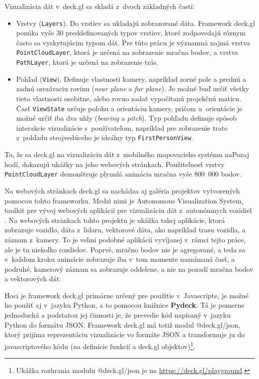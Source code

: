 Vizualizácia dát v~deck.gl sa skladá z~dvoch základných častí:
\begin{itemize}
    \item Vrstvy (\texttt{Layers}). Do vrstiev sa ukladajú zobrazované dáta. Framework deck.gl ponúka vyše 30 preddefinovaných typov vrstiev, ktoré zodpovedajú rôznym často sa vyskytujúcim typom dát. Pre túto prácu je významná najmä vrstva \texttt{PointCloudLayer}, ktorá je určená na zobrazenie mračna bodov, a vrstva \texttt{PathLayer}, ktorá je určená na zobrazenie trás.
    \item Pohľad (\texttt{View}). Definuje vlastnosti kamery, napríklad zorné pole a prednú a zadnú orezávaciu rovinu (\emph{near plane} a \emph{far plane}). Je možné buď určiť všetky tieto vlastnosti osobitne, alebo rovno zadať vypočítanú projekčnú maticu.
    Časť \texttt{ViewState} určuje polohu a orientáciu kamery, pričom u~orientácie je možné určiť iba dva uhly (\emph{bearing} a \emph{pitch}). Typ pohľadu definuje spôsob interakcie vizualizácie s~používateľom, napríklad pre zobrazenie trate z~pohľadu strojvedúceho je ideálny typ \texttt{FirstPersonView}.
\end{itemize}

To, že sa deck.gl na vizualizáciu dát z~mobilného mapovacieho systému naPozaj hodí, dokazujú ukážky na jeho webových stránkach. Použiteľnosť vrstvy \texttt{PointCloudLayer} demonštruje plynulá animácia mračna vyše 800~000 bodov.

Na webových stránkach deck.gl sa nachádza aj galéria projektov vytvorených pomocou tohto frameworku. Medzi nimi je Autonomous Visualization System, toolkit pre vývoj webových aplikácií pre vizualizáciu dát z~autonómnych vozidiel \cite{avs}. Na webových stránkach tohto projektu je ukážka takej aplikácie, ktorá zobrazuje vozidlo, dáta z~lidaru, vektorové dáta, ako napríklad trasu vozidla, a záznam z~kamery. To je veľmi podobné aplikácii vyvíjanej v~rámci tejto práce, ale je tu niekoľko rozdielov. Poprvé, mračno bodov nie je agregované, a teda sa v~každom kroku animácie zobrazuje iba v~tom momente nasnímaná časť, a podruhé, kamerový záznam sa zobrazuje oddelene, a nie na pozadí mračna bodov a vektorových dát.

Hoci je framework deck.gl primárne určený pre použitie v~Javascripte, je možné ho použiť aj v~jazyku Python, a to pomocou knižnice \textbf{Pydeck}. Tá je pomerne jednoduchá a podstatou jej činnosti je, že prevedie kód napísaný v~jazyku Python do formátu JSON. Framework deck.gl má totiž modul @deck.gl/json, ktorý prijíma reprezentáciu vizualizácie vo formáte JSON a transformuje ju do javascriptového kódu (na definície funkcií a deck.gl objektov)\footnote{Ukážka rozhrania modulu @deck.gl/json je na \url{https://deck.gl/playground}.}.

